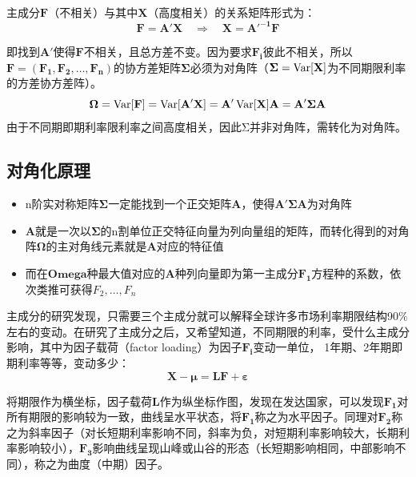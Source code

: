 \documentclass[11pt]{article}
\begin{document}
主成分$\mathbf{F}$（不相关）与其中$\mathbf{X}$（高度相关）的关系矩阵形式为： 
\begin{equation*}
	\mathbf{F=A'X} \quad\Rightarrow\quad \mathbf{X=A'^{-1}F}
\end{equation*}

即找到$\mathbf{A'}$使得$\mathbf{F}$不相关，且总方差不变。因为要求$\mathbf{F_i}$彼此不相关，所以$\mathbf{F=(F_1,F_2,\dots,F_n)}$的协方差矩阵$\bm{\Sigma}$必须为对角阵（$\bm{\Sigma}=\operatorname{Var}[\mathbf{X}]$为不同期限利率的方差协方差阵）。
\begin{equation*}
	\bm{\Omega} = \mathbf{\operatorname{Var}[F] = \operatorname{Var}[A'X] = A'\operatorname{Var}[X]A = A'\bm{\Sigma} A}
\end{equation*}
由于不同期即期利率限利率之间高度相关，因此Σ并非对角阵，需转化为对角阵。

\subsection*{对角化原理}

\begin{itemize}
    \item n阶实对称矩阵$\bm{\Sigma}$一定能找到一个正交矩阵$\mathbf{A}$，使得$\mathbf{A'\bm{\Sigma}A}$为对角阵
    \item $\mathbf{A}$就是一次以$\bm{\Sigma}$的n割单位正交特征向量为列向量组的矩阵，而转化得到的对角阵$\bm{\Omega}$的主对角线元素就是$\mathbf{A}$对应的特征值
    \item 而在$\bm{Omega}$种最大值对应的$\mathbf{A}$种列向量即为第一主成分$\mathbf{F_1}$方程种的系数，依次类推可获得$F_2,\dots,F_n$
\end{itemize}

主成分的研究发现，只需要三个主成分就可以解释全球许多市场利率期限结构90\%左右的变动。在研究了主成分之后，又希望知道，不同期限的利率，受什么主成分影响，其中为因子载荷（factor loading）为因子$\mathbf{F_i}$变动一单位， 1年期、2年期即期利率等等，变动多少：
\begin{equation*}
	\mathbf{X-\mu=LF+\varepsilon}
\end{equation*}

将期限作为横坐标，因子载荷$\mathbf{L}$作为纵坐标作图，发现在发达国家，可以发现$\mathbf{F_1}$对所有期限的影响较为一致，曲线呈水平状态，将$\mathbf{F_1}$称之为水平因子。同理对$\mathbf{F_2}$称之为斜率因子（对长短期利率影响不同，斜率为负，对短期利率影响较大，长期利率影响较小），$\mathbf{F_3}$影响曲线呈现山峰或山谷的形态（长短期影响相同，中部影响不同），称之为曲度（中期）因子。
\end{document}
